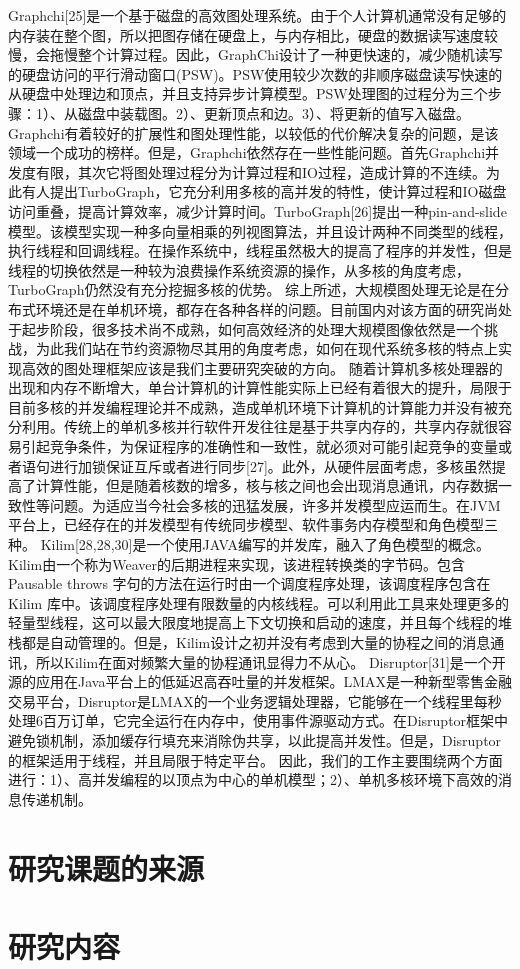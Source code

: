 Graphchi[25]是一个基于磁盘的高效图处理系统。由于个人计算机通常没有足够的内存装在整个图，所以把图存储在硬盘上，与内存相比，硬盘的数据读写速度较慢，会拖慢整个计算过程。因此，GraphChi设计了一种更快速的，减少随机读写的硬盘访问的平行滑动窗口(PSW)。PSW使用较少次数的非顺序磁盘读写快速的从硬盘中处理边和顶点，并且支持异步计算模型。PSW处理图的过程分为三个步骤：1）、从磁盘中装载图。2）、更新顶点和边。3）、将更新的值写入磁盘。Graphchi有着较好的扩展性和图处理性能，以较低的代价解决复杂的问题，是该领域一个成功的榜样。但是，Graphchi依然存在一些性能问题。首先Graphchi并发度有限，其次它将图处理过程分为计算过程和IO过程，造成计算的不连续。为此有人提出TurboGraph，它充分利用多核的高并发的特性，使计算过程和IO磁盘访问重叠，提高计算效率，减少计算时间。TurboGraph[26]提出一种pin-and-slide模型。该模型实现一种多向量相乘的列视图算法，并且设计两种不同类型的线程，执行线程和回调线程。在操作系统中，线程虽然极大的提高了程序的并发性，但是线程的切换依然是一种较为浪费操作系统资源的操作，从多核的角度考虑，TurboGraph仍然没有充分挖掘多核的优势。
综上所述，大规模图处理无论是在分布式环境还是在单机环境，都存在各种各样的问题。目前国内对该方面的研究尚处于起步阶段，很多技术尚不成熟，如何高效经济的处理大规模图像依然是一个挑战，为此我们站在节约资源物尽其用的角度考虑，如何在现代系统多核的特点上实现高效的图处理框架应该是我们主要研究突破的方向。
随着计算机多核处理器的出现和内存不断增大，单台计算机的计算性能实际上已经有着很大的提升，局限于目前多核的并发编程理论并不成熟，造成单机环境下计算机的计算能力并没有被充分利用。传统上的单机多核并行软件开发往往是基于共享内存的，共享内存就很容易引起竞争条件，为保证程序的准确性和一致性，就必须对可能引起竞争的变量或者语句进行加锁保证互斥或者进行同步[27]。此外，从硬件层面考虑，多核虽然提高了计算性能，但是随着核数的增多，核与核之间也会出现消息通讯，内存数据一致性等问题。为适应当今社会多核的迅猛发展，许多并发模型应运而生。在JVM平台上，已经存在的并发模型有传统同步模型、软件事务内存模型和角色模型三种。
Kilim[28,28,30]是一个使用JAVA编写的并发库，融入了角色模型的概念。Kilim由一个称为Weaver的后期进程来实现，该进程转换类的字节码。包含 Pausable throws 字句的方法在运行时由一个调度程序处理，该调度程序包含在 Kilim 库中。该调度程序处理有限数量的内核线程。可以利用此工具来处理更多的轻量型线程，这可以最大限度地提高上下文切换和启动的速度，并且每个线程的堆栈都是自动管理的。但是，Kilim设计之初并没有考虑到大量的协程之间的消息通讯，所以Kilim在面对频繁大量的协程通讯显得力不从心。
Disruptor[31]是一个开源的应用在Java平台上的低延迟高吞吐量的并发框架。LMAX是一种新型零售金融交易平台，Disruptor是LMAX的一个业务逻辑处理器，它能够在一个线程里每秒处理6百万订单，它完全运行在内存中，使用事件源驱动方式。在Disruptor框架中避免锁机制，添加缓存行填充来消除伪共享，以此提高并发性。但是，Disruptor的框架适用于线程，并且局限于特定平台。
因此，我们的工作主要围绕两个方面进行：1）、高并发编程的以顶点为中心的单机模型；2）、单机多核环境下高效的消息传递机制。

\section{研究课题的来源}

\section{研究内容}


